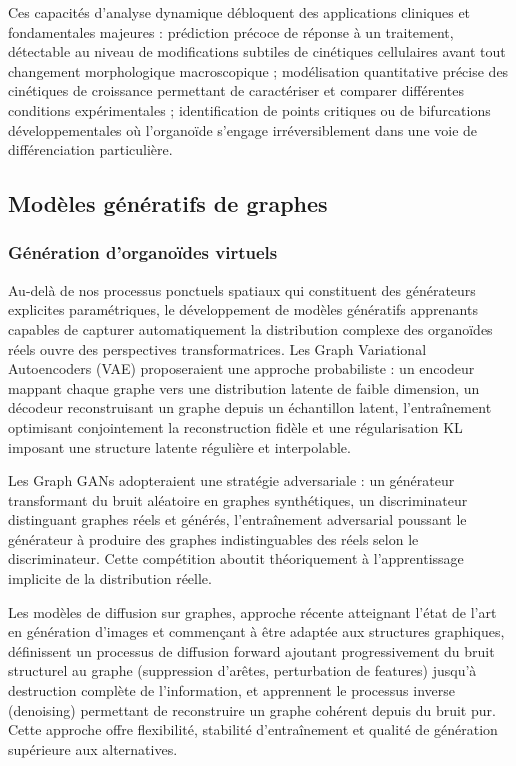 Ces capacités d'analyse dynamique débloquent des applications cliniques et fondamentales majeures : prédiction précoce de réponse à un traitement, détectable au niveau de modifications subtiles de cinétiques cellulaires avant tout changement morphologique macroscopique ; modélisation quantitative précise des cinétiques de croissance permettant de caractériser et comparer différentes conditions expérimentales ; identification de points critiques ou de bifurcations développementales où l'organoïde s'engage irréversiblement dans une voie de différenciation particulière.

\subsection{Modèles génératifs de graphes}

\subsubsection{Génération d'organoïdes virtuels}

Au-delà de nos processus ponctuels spatiaux qui constituent des générateurs explicites paramétriques, le développement de modèles génératifs apprenants capables de capturer automatiquement la distribution complexe des organoïdes réels ouvre des perspectives transformatrices. Les Graph Variational Autoencoders (VAE) proposeraient une approche probabiliste : un encodeur mappant chaque graphe vers une distribution latente de faible dimension, un décodeur reconstruisant un graphe depuis un échantillon latent, l'entraînement optimisant conjointement la reconstruction fidèle et une régularisation KL imposant une structure latente régulière et interpolable.

Les Graph GANs adopteraient une stratégie adversariale : un générateur transformant du bruit aléatoire en graphes synthétiques, un discriminateur distinguant graphes réels et générés, l'entraînement adversarial poussant le générateur à produire des graphes indistinguables des réels selon le discriminateur. Cette compétition aboutit théoriquement à l'apprentissage implicite de la distribution réelle.

Les modèles de diffusion sur graphes, approche récente atteignant l'état de l'art en génération d'images et commençant à être adaptée aux structures graphiques, définissent un processus de diffusion forward ajoutant progressivement du bruit structurel au graphe (suppression d'arêtes, perturbation de features) jusqu'à destruction complète de l'information, et apprennent le processus inverse (denoising) permettant de reconstruire un graphe cohérent depuis du bruit pur. Cette approche offre flexibilité, stabilité d'entraînement et qualité de génération supérieure aux alternatives.

